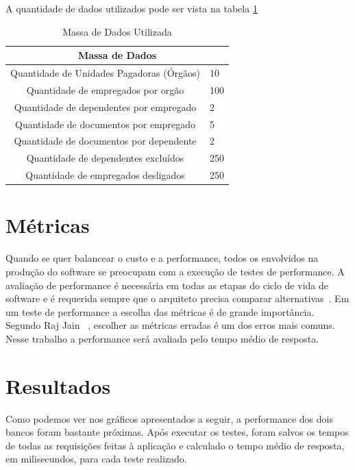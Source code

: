 A quantidade de dados utilizados pode ser vista na tabela \ref{tab:massadadosutil}

\begin{table}
	\caption{Massa de Dados Utilizada}
	\begin{center}
	\begin{tabularx}{\textwidth}{ | c | X | }
	\hline
		\multicolumn{2}{|c|}{\textbf{Massa de Dados}} \\
	\hline
		Quantidade de Unidades Pagadoras (Órgãos) &  10\\
	\hline
		Quantidade de empregados por orgão & 100\\
	\hline 
		Quantidade de dependentes por empregado & 2 \\
	\hline
		Quantidade de documentos por empregado & 5\\
	\hline
		Quantidade de documentos por dependente & 2\\
	\hline
		Quantidade de dependentes excluídos & 250\\
	\hline
		Quantidade de empregados desligados & 250\\
	\hline
	\end {tabularx}
	\end{center}
	\label{tab:massadadosutil}
\end{table}

\section{Métricas}

Quando se quer balancear o custo e a performance, todos os envolvidos na produção do software se preocupam com a execução de testes de performance. A avaliação de performance é necessária em todas as etapas do ciclo de vida de software e é requerida sempre que o arquiteto precisa comparar alternativas~\cite{rajjain}. Em um teste de performance a escolha das métricas é de grande importância. Segundo Raj Jain ~\cite{rajjain}, escolher as métricas erradas é um dos erros mais comuns. Nesse trabalho a performance será avaliada pelo tempo médio de resposta.

\section{Resultados}

Como podemos ver nos gráficos apresentados a seguir, a performance dos dois bancos foram bastante próximas. Após executar os testes, foram salvos os tempos de todas as requisições feitas à aplicação e calculado o tempo médio de resposta, em milisecundos, para cada teste realizado.


